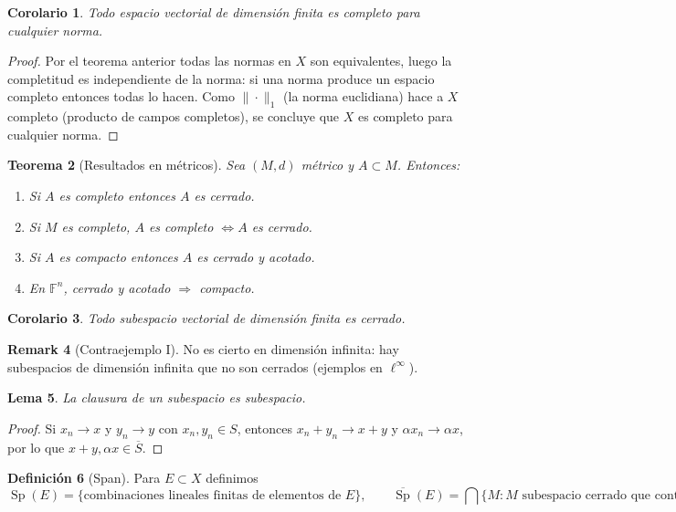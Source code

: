 \documentclass[11pt]{article}
\theoremstyle{definition}
\newtheorem{definition}{Definición}[section]
\newtheorem{remark}[definition]{Remark}
\theoremstyle{plain}
\newtheorem{lemma}[definition]{Lema}
\newtheorem{theorem}[definition]{Teorema}
\newtheorem{corollary}[definition]{Corolario}
\begin{document}
\begin{corollary}
Todo espacio vectorial de dimensión finita es completo para cualquier norma.
\end{corollary}
\begin{proof}
Por el teorema anterior todas las normas en $X$ son equivalentes, luego la completitud es independiente de la norma: si una norma produce un espacio completo entonces todas lo hacen. Como $\|\cdot\|_1$ (la norma euclidiana) hace a $X$ completo (producto de campos completos), se concluye que $X$ es completo para cualquier norma.
\end{proof}

\begin{theorem}[Resultados en métricos]
Sea $(M,d)$ métrico y $A\subset M$. Entonces:
\begin{enumerate}[label=(\arabic*)]
\item Si $A$ es completo entonces $A$ es cerrado.
\item Si $M$ es completo, $A$ es completo $\iff A$ es cerrado.
\item Si $A$ es compacto entonces $A$ es cerrado y acotado.
\item En $\mathbb{F}^n$, cerrado y acotado $\Rightarrow$ compacto.
\end{enumerate}
\end{theorem}

\begin{corollary}
Todo subespacio vectorial de dimensión finita es cerrado.
\end{corollary}

\begin{remark}[Contraejemplo I]
No es cierto en dimensión infinita: hay subespacios de dimensión infinita que no son cerrados (ejemplos en $\ell^\infty$).
\end{remark}

\begin{lemma}
La clausura de un subespacio es subespacio.
\end{lemma}
\begin{proof}
Si $x_n\to x$ y $y_n\to y$ con $x_n,y_n\in S$, entonces $x_n+y_n\to x+y$ y $\alpha x_n\to\alpha x$, por lo que $x+y,\alpha x\in\overline S$.
\end{proof}

\begin{definition}[Span]
Para $E\subset X$ definimos
$$\operatorname{Sp}(E)=\{\text{combinaciones lineales finitas de elementos de }E\},\qquad\overline{\operatorname{Sp}}(E)=\bigcap\{M: M\text{ subespacio cerrado que contiene }E\}.$$ 
\end{definition}
\end{document}
